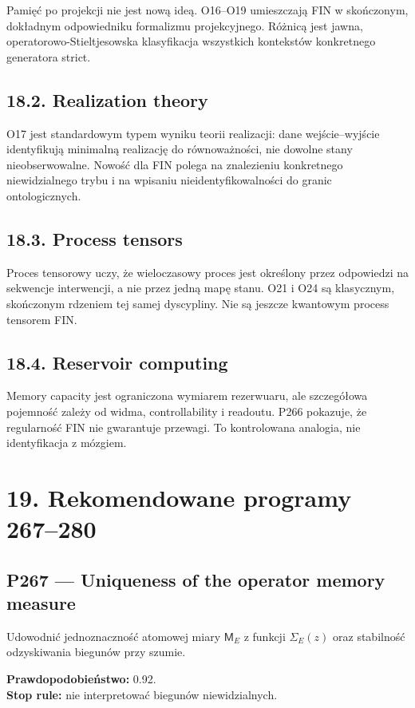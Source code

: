 \documentclass[11pt,a4paper,openany]{report}
\begin{document}
Pamięć po projekcji nie jest nową ideą. O16--O19 umieszczają FIN w skończonym, dokładnym odpowiedniku formalizmu projekcyjnego. Ró\.znicą jest jawna, operatorowo-Stieltjesowska klasyfikacja wszystkich kontekstów konkretnego generatora strict.

\section{18.2. Realization theory}

O17 jest standardowym typem wyniku teorii realizacji: dane wejście--wyjście identyfikują minimalną realizację do równowa\.zności, nie dowolne stany nieobserwowalne. Nowość dla FIN polega na znalezieniu konkretnego niewidzialnego trybu i na wpisaniu nieidentyfikowalności do granic ontologicznych.

\section{18.3. Process tensors}

Proces tensorowy uczy, \.ze wieloczasowy proces jest określony przez odpowiedzi na sekwencje interwencji, a nie przez jedną mapę stanu. O21 i O24 są klasycznym, skończonym rdzeniem tej samej dyscypliny. Nie są jeszcze kwantowym process tensorem FIN.

\section{18.4. Reservoir computing}

Memory capacity jest ograniczona wymiarem rezerwuaru, ale szczegółowa pojemność zale\.zy od widma, controllability i readoutu. P266 pokazuje, \.ze regularność FIN nie gwarantuje przewagi. To kontrolowana analogia, nie identyfikacja z mózgiem.

\chapter{19. Rekomendowane programy 267--280}

\section{P267 --- Uniqueness of the operator memory measure}

Udowodnić jednoznaczność atomowej miary \(\mathsf M_E\) z funkcji \(\Sigma_E(z)\) oraz stabilność odzyskiwania biegunów przy szumie.

\textbf{Prawdopodobieństwo:} 0.92.\\
\textbf{Stop rule:} nie interpretować biegunów niewidzialnych.
\end{document}
